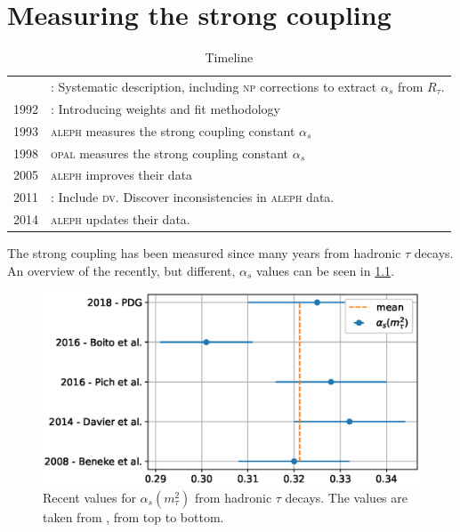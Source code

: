 \documentclass[../../index.tex]{subfiles}
\begin{document}
\chapter{Measuring the strong coupling}


\begin{table}
  \vspace{-1.1cm}
  \caption{Timeline} 
  \begin{tabular}{@{\,}r <{\hskip 5pt} !{\foo}
      >{\raggedright\arraybackslash}p{5cm}}
    \toprule
     & \cite{Braaten1991}: Systematic description, including \textsc{np} corrections to extract \(\alpha_s\) from \(R_\tau\). \\
    1992 & \cite{LeDiberder1992}: Introducing weights and fit methodology \\
    1993 & \cite{Aleph1993} \textsc{aleph} measures the strong coupling constant \(\alpha_s\)\\
    1998 & \cite{Opal1998} \textsc{opal} measures the strong coupling constant \(\alpha_s\)\\
    2005 & \cite{Aleph2005} \textsc{aleph} improves their data \\
    2011 & \cite{Boito2011a,Boito2010}: Include \textsc{dv}. Discover inconsistencies in \textsc{aleph} data. \\
    2014 & \cite{Davier2013} \textsc{aleph} updates their data. \\
  \end{tabular}
  \label{table:AlphasTauTimeline}
\end{table}
The strong coupling has been measured since many years from hadronic \(\tau\)
decays. An overview of the recently, but different, \(\alpha_s\) values can be
seen in \cref{fig:historicAlphasComparison}.
\begin{figure}
  \centering
  \includegraphics[width=\textwidth]{./images/historicAlphasComparison.eps}
  \caption{Recent values for \(\alpha_s(m_\tau^2)\) from hadronic \(\tau\)
    decays. The values are taken from \cite{PDG2018, Boito2016, Pich2016,
      Davier2013, Beneke2008}, from top to bottom.}
  \label{fig:historicAlphasComparison}
\end{figure}
\end{document}
